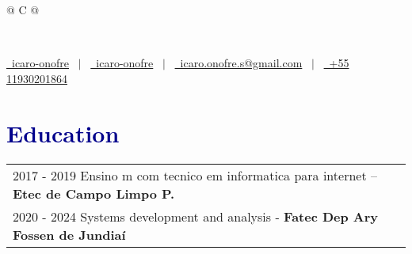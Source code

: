 \documentclass[a4paper,12pt]{article}
\begin{document}
\pagestyle{empty} 



\begin{tabularx}{\linewidth}{@{} C @{}}
\begin{flushleft}
	\fontsize{30}{60} \\[10pt]
\end{flushleft}
\color{black}
\href{https://github.com/icaro-onofre}{\raisebox{-0.05\height}\faGithub\ icaro-onofre} \ $|$ \ 
\href{https://linkedin.com/in/icaro-onofre}{\raisebox{-0.05\height}\faLinkedin\ icaro-onofre} \ $|$ \ 
\href{mailto:icaro.onofre.s@gmail.com}{\raisebox{-0.05\height}\faEnvelope \ icaro.onofre.s@gmail.com} \ $|$ \ 
\href{tel:+11930201864}{\raisebox{-0.05\height}\faMobile \ +55 11930201864} \\
\end{tabularx}
\section{{\textcolor{darkblue}{\textbf{Education}}}}
\begin{tabularx}{\linewidth}{@{}l X@{}}	

	2017 - 2019 Ensino m com tecnico em informatica para internet –\textbf{Etec de Campo Limpo P.} \\

2020 - 2024 Systems development and analysis - \textbf{Fatec Dep Ary Fossen de Jundiaí} \\

\end{tabularx}
\end{document}
